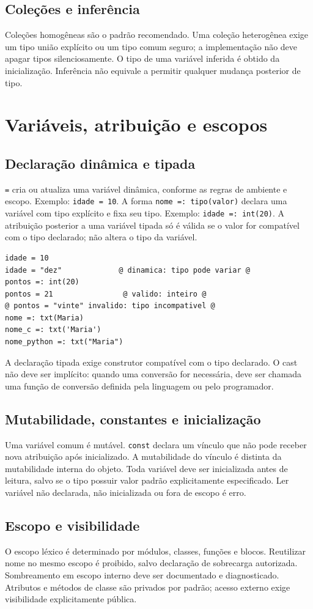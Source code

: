 \documentclass[12pt,a4paper]{article}
\begin{document}
\subsection{Coleções e inferência}
Coleções homogêneas são o padrão recomendado. Uma coleção heterogênea exige um tipo união explícito ou um tipo comum seguro; a implementação não deve apagar tipos silenciosamente. O tipo de uma variável inferida é obtido da inicialização. Inferência não equivale a permitir qualquer mudança posterior de tipo.
\section{Variáveis, atribuição e escopos}
\subsection{Declaração dinâmica e tipada}
\texttt{=} cria ou atualiza uma variável dinâmica, conforme as regras de ambiente e escopo. Exemplo: \texttt{idade = 10}. A forma \texttt{nome =: tipo(valor)} declara uma variável com tipo explícito e fixa seu tipo. Exemplo: \texttt{idade =: int(20)}. A atribuição posterior a uma variável tipada só é válida se o valor for compatível com o tipo declarado; não altera o tipo da variável.
\begin{lstlisting}
idade = 10
idade = "dez"             @ dinamica: tipo pode variar @
pontos =: int(20)
pontos = 21                @ valido: inteiro @
@ pontos = "vinte" invalido: tipo incompativel @
nome =: txt(Maria)
nome_c =: txt('Maria')
nome_python =: txt("Maria")
\end{lstlisting}
A declaração tipada exige construtor compatível com o tipo declarado. O cast não deve ser implícito: quando uma conversão for necessária, deve ser chamada uma função de conversão definida pela linguagem ou pelo programador.
\subsection{Mutabilidade, constantes e inicialização}
Uma variável comum é mutável. \texttt{const} declara um vínculo que não pode receber nova atribuição após inicializado. A mutabilidade do vínculo é distinta da mutabilidade interna do objeto. Toda variável deve ser inicializada antes de leitura, salvo se o tipo possuir valor padrão explicitamente especificado. Ler variável não declarada, não inicializada ou fora de escopo é erro.
\subsection{Escopo e visibilidade}
O escopo léxico é determinado por módulos, classes, funções e blocos. Reutilizar nome no mesmo escopo é proibido, salvo declaração de sobrecarga autorizada. Sombreamento em escopo interno deve ser documentado e diagnosticado. Atributos e métodos de classe são privados por padrão; acesso externo exige visibilidade explicitamente pública.
\end{document}
